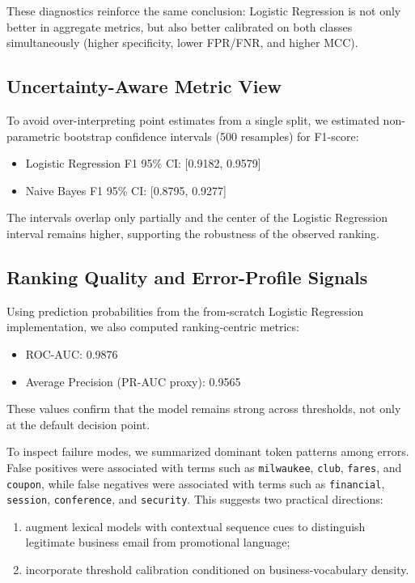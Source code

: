 These diagnostics reinforce the same conclusion: Logistic Regression is not only better in aggregate metrics, but also better calibrated on both classes simultaneously (higher specificity, lower FPR/FNR, and higher MCC).

\subsection{Uncertainty-Aware Metric View}

To avoid over-interpreting point estimates from a single split, we estimated non-parametric bootstrap confidence intervals (500 resamples) for F1-score:
\begin{itemize}
    \item Logistic Regression F1 95\% CI: [0.9182, 0.9579]
    \item Naive Bayes F1 95\% CI: [0.8795, 0.9277]
\end{itemize}

The intervals overlap only partially and the center of the Logistic Regression interval remains higher, supporting the robustness of the observed ranking.

\subsection{Ranking Quality and Error-Profile Signals}

Using prediction probabilities from the from-scratch Logistic Regression implementation, we also computed ranking-centric metrics:
\begin{itemize}
    \item ROC-AUC: 0.9876
    \item Average Precision (PR-AUC proxy): 0.9565
\end{itemize}

These values confirm that the model remains strong across thresholds, not only at the default decision point.

To inspect failure modes, we summarized dominant token patterns among errors. False positives were associated with terms such as \texttt{milwaukee}, \texttt{club}, \texttt{fares}, and \texttt{coupon}, while false negatives were associated with terms such as \texttt{financial}, \texttt{session}, \texttt{conference}, and \texttt{security}. This suggests two practical directions:
\begin{enumerate}
    \item augment lexical models with contextual sequence cues to distinguish legitimate business email from promotional language;
    \item incorporate threshold calibration conditioned on business-vocabulary density.
\end{enumerate}

